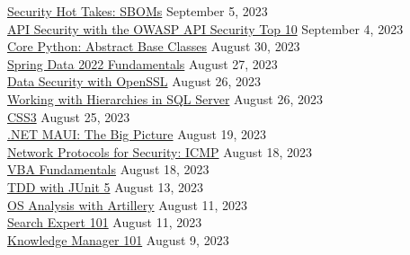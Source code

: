 \documentclass[10pt]{res} %
\begin{document}
\begin{resume}
\href{https://bjdelacruz.dev/files/certificates/pluralsight/13_Security_Hot_Takes_SBOMs.pdf}{\color{blue}Security Hot Takes: SBOMs} \hfill September 5, 2023 \\
\href{https://bjdelacruz.dev/files/certificates/pluralsight/API_Security_with_the_OWASP_API_Security_Top_10.pdf}{\color{blue}API Security with the OWASP API Security Top 10} \hfill September 4, 2023 \\
\href{https://bjdelacruz.dev/files/certificates/pluralsight/Core_Python_Abstract_Base_Classes.pdf}{\color{blue}Core Python: Abstract Base Classes} \hfill August 30, 2023 \\
\href{https://bjdelacruz.dev/files/certificates/pluralsight/Spring_Data_2022_Fundamentals.pdf}{\color{blue}Spring Data 2022 Fundamentals} \hfill August 27, 2023 \\
\href{https://bjdelacruz.dev/files/certificates/pluralsight/Data_Security_with_OpenSSL.pdf}{\color{blue}Data Security with OpenSSL} \hfill August 26, 2023 \\
\href{https://bjdelacruz.dev/files/certificates/pluralsight/Working_with_Hierarchies_in_SQL_Server.pdf}{\color{blue}Working with Hierarchies in SQL Server} \hfill August 26, 2023 \\
\href{https://bjdelacruz.dev/files/certificates/pluralsight/CSS3.pdf}{\color{blue}CSS3} \hfill August 25, 2023 \\
\href{https://bjdelacruz.dev/files/certificates/pluralsight/NET_MAUI_The_Big_Picture.pdf}{\color{blue}.NET MAUI: The Big Picture} \hfill August 19, 2023 \\
\href{https://bjdelacruz.dev/files/certificates/pluralsight/7_Network_Protocols_for_Security_ICMP.pdf}{\color{blue}Network Protocols for Security: ICMP} \hfill August 18, 2023 \\
\href{https://bjdelacruz.dev/files/certificates/pluralsight/VBA_Fundamentals.pdf}{\color{blue}VBA Fundamentals} \hfill August 18, 2023 \\
\href{https://bjdelacruz.dev/files/certificates/pluralsight/TDD_with_JUnit_5.pdf}{\color{blue}TDD with JUnit 5} \hfill August 13, 2023 \\
\href{https://bjdelacruz.dev/files/certificates/pluralsight/14_OS_Analysis_with_Artillery.pdf}{\color{blue}OS Analysis with Artillery} \hfill August 11, 2023 \\
\href{https://bjdelacruz.dev/files/certificates/pluralsight/Search_Expert_101.pdf}{\color{blue}Search Expert 101} \hfill August 11, 2023 \\
\href{https://bjdelacruz.dev/files/certificates/pluralsight/Knowledge_Manager_101.pdf}{\color{blue}Knowledge Manager 101} \hfill August 9, 2023 \\

\end{resume}
\end{document}
